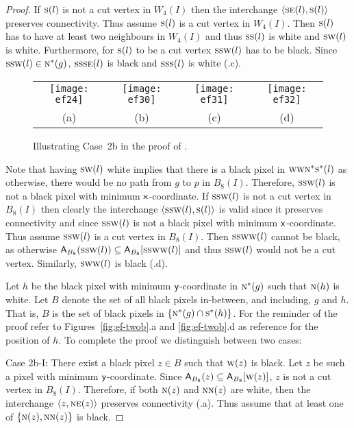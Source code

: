 \documentclass[lotsofwhite,charterfonts]{patmorin}
\newcommand{\N}{\textsc{n}}
\newcommand{\NE}{\textsc{ne}}
\newcommand{\SE}{\textsc{se}}
\renewcommand{\S}{\textsc{s}}
\newcommand{\SW}{\textsc{sw}}
\newcommand{\W}{\textsc{w}}
\newcommand{\x}{\ensuremath{\protect\textup{\textsf{x}}}}
\newcommand{\y}{\ensuremath{\protect\textup{\textsf{y}}}}
\newcommand{\ic}[2]{\langle #1,#2 \rangle}
\newcommand{\A}[2]{\ensuremath{\protect\textup{\textsf{A}}_{#2}(#1)}}
\newcommand{\AC}[2]{\ensuremath{\protect\textup{\textsf{A}}_{#2}[#1]}}
\newcommand{\se}{\ensuremath{\subseteq}}
\begin{document}
\begin{proof}
If $\S(l)$ is not a cut vertex in $W_4(I)$ then the interchange $\ic{\SE(l)}{\S(l)}$ preserves connectivity. Thus assume $\S(l)$ is a cut vertex in $W_4(I)$. Then $\S(l)$ has to have at least two neighbours in $W_4(I)$ and thus $\S\S(l)$ is white and $\SW(l)$ is white.  Furthermore, for $\S(l)$ to be a cut vertex $\S\SW(l)$ has to be black. Since $\S\SW(l)\in \N^*(g)$, $\S\S\SE(l)$ is black and $\S\S\S(l)$ is white (.c).
 
\begin{figure}[htbp]
\begin{center}
\begin{tabular}{cccc}
\texttt{[image: ef24]} &
\texttt{[image: ef30]} &
\texttt{[image: ef31]} & 
\texttt{[image: ef32]}\\
(a) & (b) & (c) & (d)
\end{tabular}
\end{center}
\caption{Illustrating Case~2b in the proof of .}
\end{figure}

Note that having $\SW(l)$ white implies that there is a black pixel in $\W\W\N^*\S^*(l)$ as otherwise, there would be no path from $g$ to $p$ in $B_8(I)$. Therefore, $\S\S\W(l)$ is not a black pixel with  minimum \x-coordinate. If $\S\S\W(l)$ is not a cut vertex in $B_8(I)$ then clearly the interchange $\ic{\S\S\W(l)}{\S(l)}$ is valid since it preserves connectivity and  since $\S\S\W(l)$ is not a black pixel with minimum \x-coordinate. Thus assume $\S\S\W(l)$ is a cut vertex in $B_8(I)$. Then $\S\S\W\W(l)$ cannot be black, as otherwise $\A{\S\S\W(l)}{B_8}\se \AC{\S\S\W\W(l)}{B_8}$ and thus $\S\S\W(l)$ would not be a cut vertex. Similarly, $\S\W\W(l)$ is black (.d). 

Let $h$ be the black pixel with minimum \y-coordinate in $\N^*(g)$
such that $\N(h)$ is white. Let $B$ denote the set of all black pixels
in-between, and including, $g$ and $h$. That is, $B$ is the set of
black pixels in $\{\N^*(g)\cap \S^*(h)\}$. For the reminder of the
proof refer to Figures~\ref{fig:ef-twob}.a and \ref{fig:ef-twob}.d as
reference for the position of $h$. To complete the proof we
distinguish between two cases: 


\noindent Case 2b-I: There exist a black pixel $z\in B$ such that
$\W(z)$ is black. Let $z$ be such a pixel with minimum \y-coordinate.
Since $\A{z}{B_8}\se \AC{\W(z)}{B_8}$, $z$ is not a cut vertex in
$B_8(I)$. Therefore, if both  $\N(z)$ and  $\N\N(z)$ are white, then
the interchange $\ic{z}{\NE(z)}$ preserves connectivity
(.a). Thus assume that at least one of
$\{\N(z),\N\N(z)\}$ is black. 



\end{proof}
\end{document}
